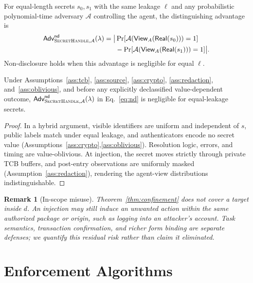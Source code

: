 \documentclass[sigconf,10pt]{acmart}
\newcommand{\SH}{\textsc{SecretHandle}}
\newcommand{\Adv}{\ensuremath{\mathsf{Adv}}}
\newcommand{\View}{\ensuremath{\mathsf{View}}}
\newcommand{\Real}{\ensuremath{\mathsf{Real}}}
\theoremstyle{acmplain}%
\newtheorem{remark}[theorem]{Remark}%
\begin{document}
\begin{definition}
\label{def:nd}
For equal-length secrets $s_0,s_1$ with the same leakage $\ell$ and any probabilistic polynomial-time adversary $\mathcal{A}$ controlling the agent, the distinguishing advantage is
\begin{equation}
\begin{aligned}
\Adv^{\mathsf{nd}}_{\SH,\mathcal{A}}(\lambda)=\bigl|&\Pr[\mathcal{A}(\View_A(\Real(s_0)))=1]\\
&-\Pr[\mathcal{A}(\View_A(\Real(s_1)))=1]\bigr|.
\end{aligned}
\label{eq:nd}
\end{equation}
Non-disclosure holds when this advantage is negligible for equal $\ell$.
\end{definition}

\begin{theorem}
\label{thm:nd}
Under Assumptions~\ref{ass:tcb}, \ref{ass:source}, \ref{ass:crypto}, \ref{ass:redaction}, and~\ref{ass:oblivious}, and before any explicitly declassified value-dependent outcome, $\Adv^{\mathsf{nd}}_{\SH,\mathcal{A}}(\lambda)$ in Eq.~\eqref{eq:nd} is negligible for equal-leakage secrets.
\end{theorem}
\begin{proof}
In a hybrid argument, visible identifiers are uniform and independent of $s$, public labels match under equal leakage, and authenticators encode no secret value (Assumptions~\ref{ass:crypto},\ref{ass:oblivious}). Resolution logic, errors, and timing are value-oblivious. At injection, the secret moves strictly through private TCB buffers, and post-entry observations are uniformly masked (Assumption~\ref{ass:redaction}), rendering the agent-view distributions indistinguishable.
\end{proof}

\begin{remark}[In-scope misuse]
Theorem~\ref{thm:confinement} does not cover a target inside $d$. An injection may still induce an unwanted action within the same authorized package or origin, such as logging into an attacker's account. Task semantics, transaction confirmation, and richer form binding are separate defenses; we quantify this residual risk rather than claim it eliminated.
\end{remark}
\section{Enforcement Algorithms}
\label{sec:algorithm}
\end{document}
